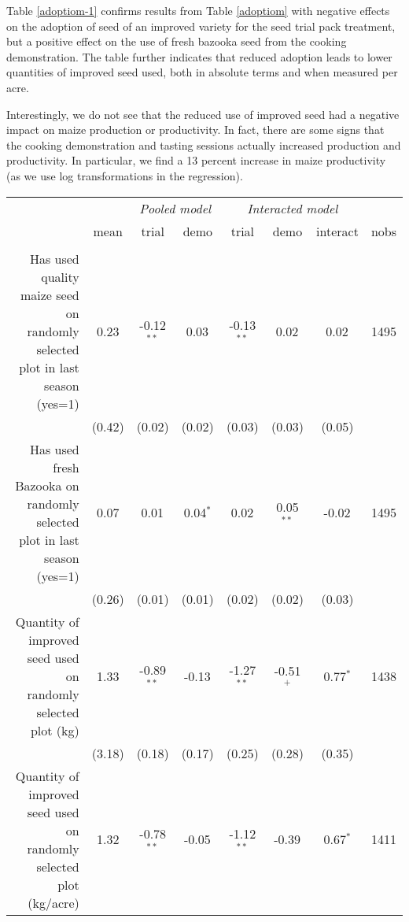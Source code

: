 \documentclass[english]{article}\usepackage[]{graphicx}\usepackage[]{xcolor}
\begin{document}
Table \ref{adoptiom-1} confirms results from Table \ref{adoptiom}
with negative effects on the adoption of seed of an improved variety
for the seed trial pack treatment, but a positive effect on the use
of fresh bazooka seed from the cooking demonstration. The table further
indicates that reduced adoption leads to lower quantities of improved
seed used, both in absolute terms and when measured per acre.

Interestingly, we do not see that the reduced use of improved seed
had a negative impact on maize production or productivity. In fact,
there are some signs that the cooking demonstration and tasting sessions
actually increased production and productivity. In particular, we
find a 13 percent increase in maize productivity (as we use log transformations
in the regression). 

\begin{sidewaystable}
\caption{Adoption on random plot\label{adoptiom-1}}

\footnotesize
\begin{center}
\begin{tabular}{rccccccc}
\hline\hline
& & \multicolumn{2}{c}{\textit{Pooled model}} & \multicolumn{3}{c}{\textit{Interacted model}} \\
& mean & trial & demo & trial & demo & interact & nobs \\
\hline
\\
Has used quality maize seed on randomly selected plot in last season (yes=1)
& 0.23
& -0.12$^{**}$
& 0.03$^{}$ 
& -0.13$^{**}$ 
& 0.02$^{}$
& 0.02$^{}$ & 1495 \\

& (0.42) & (0.02)  & (0.02) & (0.03)  & (0.03)  & (0.05)
 \\

Has used fresh Bazooka on randomly selected plot in last season (yes=1)
& 0.07
& 0.01$^{}$
& 0.04$^{*}$ 
& 0.02$^{}$ 
& 0.05$^{**}$
& -0.02$^{}$ & 1495 \\

& (0.26) & (0.01)  & (0.01) & (0.02)  & (0.02)  & (0.03)
 \\

Quantity of improved seed used on randomly selected plot (kg)
& 1.33
& -0.89$^{**}$
& -0.13$^{}$ 
& -1.27$^{**}$ 
& -0.51$^{+}$
& 0.77$^{*}$ & 1438 \\

& (3.18) & (0.18)  & (0.17) & (0.25)  & (0.28)  & (0.35)
 \\

Quantity of improved seed used on randomly selected plot (kg/acre)
& 1.32
& -0.78$^{**}$
& -0.05$^{}$ 
& -1.12$^{**}$ 
& -0.39$^{}$
& 0.67$^{*}$ & 1411 \\


\end{tabular}
\end{center}
\end{sidewaystable}
\end{document}
